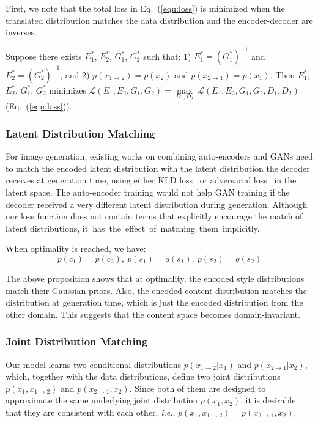 \documentclass[runningheads]{llncs}
\begin{document}
	First, we note that the total loss in Eq.~(\ref{equ:loss}) is minimized when the translated distribution matches the data distribution and the encoder-decoder are inverses.
	\begin{proposition}
		Suppose there exists $E^{*}_{1}$, $E^{*}_{2}$, $G^{*}_{1}$, $G^{*}_{2}$ such that: 1) $E^{*}_{1} = (G^{*}_{1})^{-1}$ and $E^{*}_{2} = (G^{*}_{2})^{-1}$, and 2) $p(x_{1\rightarrow 2}) = p(x_{2})$ and $p(x_{2\rightarrow 1}) = p(x_{1})$. Then $E^{*}_{1}$, $E^{*}_{2}$, $G^{*}_{1}$, $G^{*}_{2}$ minimizes $\mathcal{L}(E_{1}, E_{2}, G_{1}, G_{2})=\underset{D_{1}, D_{2}}\max\ \mathcal{L}(E_{1}, E_{2}, G_{1}, G_{2}, D_{1}, D_{2})$ (Eq.~(\ref{equ:loss})).
\end{proposition}

	\subsubsection{Latent Distribution Matching} For image generation, existing works on combining auto-encoders and GANs need to match the encoded latent distribution with the latent distribution the decoder receives at generation time, using either KLD loss~\cite{liu2017unsupervised,larsen2016autoencoding} or adversarial loss~\cite{royer2017xgan,rosca2017variational} in the latent space. The auto-encoder training would not help GAN training if the decoder received a very different latent distribution during generation. Although our loss function does not contain terms that explicitly encourage the match of latent distributions, \mbox{it has the effect of matching them implicitly.}
	\begin{proposition}
		When optimality is reached, we have:
		\label{proposition:2}
		$$p(c_{1})=p(c_{2}),\ p(s_{1})=q(s_{1}),\ p(s_{2})=q(s_{2})$$		
	\end{proposition}
	The above proposition shows that at optimality, the encoded style distributions match their Gaussian priors. Also, the encoded content distribution matches the distribution at generation time, which is just the encoded distribution from the other domain. This suggests that the content space becomes domain-invariant.

	\subsubsection{Joint Distribution Matching} Our model learns two conditional distributions $p(x_{1\rightarrow 2}| x_{1})$ and $p(x_{2\rightarrow 1}| x_{2})$, which, together with the data distributions, define two joint distributions $p(x_{1}, x_{1\rightarrow 2})$ and  $p(x_{2\rightarrow 1}, x_{2})$. Since both of them are designed to approximate the same underlying joint distribution $p(x_{1}, x_{2})$, it is desirable that they are consistent with each other, \textit{i.e.}, $p(x_{1}, x_{1\rightarrow 2}) = p(x_{2\rightarrow 1}, x_{2})$.
	
\end{document}
